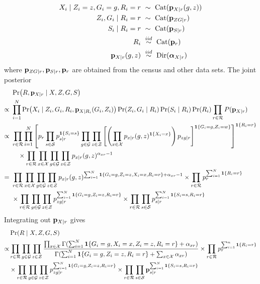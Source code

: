 \documentclass[11pt]{article}
\theoremstyle{plain}
\newcommand{\iid}{\mathrel{\stackrel{iid}{\sim}}}
\newcommand{\Dir}{\mathrm{Dir}}
\newcommand{\Cat}{\mathrm{Cat}}
\newcommand{\cZ}{\mathcal{Z}}
\newcommand{\cS}{\mathcal{S}}
\newcommand{\cR}{\mathcal{R}}
\newcommand{\cG}{\mathcal{G}}
\newcommand{\cX}{\mathcal{X}}
\begin{document}
\begin{align}
  X_i \mid Z_i = z, G_i = g,  R_i = r \ &\sim \ \Cat(\vb p_{X|r}(g,z))  \\
  Z_i, G_i \mid R_i  = r \ &\sim \ \Cat(\vb p_{ZG|r}) \\
  S_i \mid R_i = r \ &\sim \ \Cat(\vb p_{S|r})  \\
  R_i \ &\iid \ \Cat(\vb p_r) \\
  \vb p_{X|r}(g,z) \ &\iid \ \Dir(\bm\alpha_{X|r})
\end{align}
where $\vb p_{ZG|r}, \vb p_{S|r}, \vb p_r$ are obtained from the census and other
data sets.  The joint posterior
\begin{align}
  & \Pr(R, \vb p_{X|r} \mid X, Z, G, S) \\
  \propto \ & \prod_{i=1}^N \Pr(X_i \mid Z_i, G_i,
  R_i, \vb p_{X|R_i}(G_i, Z_i))\Pr(Z_i, G_i \mid R_i) \Pr(S_i \mid R_i) \Pr(R_i) \prod_{r
              \in \cR} P(\vb p_{X|r}) \\
  \propto \ & \prod_{r \in \cR} \prod_{i=1}^N  \left[p_r \prod_{s \in \cS}
             p_{s|r}^{\mathbf{1}\{S_i = s\}} \prod_{g \in \cG} \prod_{z \in \cZ}
             \left[ \left(\prod_{x \in \cX} p_{x|r}(g,z)^{\mathbf{1}\{X_i = x\}}\right)
              p_{zg|r}\right]^{\mathbf{1}\{G_i = g, Z_i =
              w\}} \right]^{\mathbf{1}\{R_i = r\}} \\
  & \quad \times \prod_{r \in \cR} \prod_{x \in \cX} \prod_{g \in \cG}
    \prod_{z \in \cZ} p_{x|r}(g,z)^{\alpha_{xr}-1} \\
  = \ &  \prod_{r \in \cR} \prod_{x \in \cX} \prod_{g \in \cG}
    \prod_{z \in \cZ} p_{x|r}(g,z)^{\sum_{i=1}^N \mathbf{1}\{G_i = g,
        Z_i = z, X_i = x, R_i = r\} + \alpha_{xr}-1} \times \prod_{r
        \in \cR} p_r^{\sum_{i=1}^N \mathbf{1}\{R_i = r\}} \\
  & \times \prod_{r \in \cR} \prod_{g \in \cG}
    \prod_{z \in \cZ}p_{zg|r}^{\sum_{i=1}^N \mathbf{1}\{G_i = g,
        Z_i = z, R_i = r\}} \times \prod_{r  \in \cR} \prod_{s \in \cS}
    p_{s|r}^{\sum_{i=1}^N \mathbf{1}\{S_i = s, R_i = r\}}
\end{align}
Integrating out $\vb p_{X|r}$ gives
\begin{align}
  &  \Pr(R \mid X, Z, G, S) \\
\propto  & \prod_{r \in \cR} \prod_{g \in \cG}
    \prod_{z \in \cZ} \frac{\prod_{x \in \cX}\Gamma(\sum_{i=1}^N \mathbf{1}\{G_i =
           g, X_i = x,  Z_i = z, R_i = r\} + \alpha_{xr})}{\Gamma(\sum_{i=1}^N
           \mathbf{1}\{G_i = g,
           Z_i = z, R_i = r\} + \sum_{x\in\cX} \alpha_{xr})} \times \prod_{r
        \in \cR} p_r^{\sum_{i=1}^n \mathbf{1}\{R_i = r\}} \\
  & \times \prod_{r \in \cR} \prod_{g \in \cG}
    \prod_{z \in \cZ}p_{zg|r}^{\sum_{i=1}^N \mathbf{1}\{G_i = g,
        Z_i = z, R_i = r\}} \times \prod_{r  \in \cR} \prod_{s \in \cS}
    \vb p_{s|r}^{\sum_{i=1}^N \mathbf{1}\{S_i = s, R_i = r\}}
\end{align}
\end{document}
